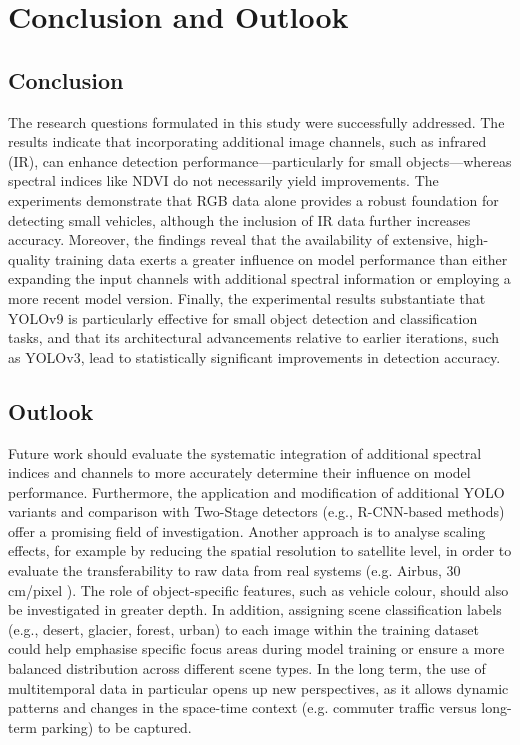 \chapter{Conclusion and Outlook}
\label{ch:conclusion}

\section{Conclusion}

The research questions formulated in this study were successfully addressed. 
The results indicate that incorporating additional image channels, such as infrared (IR), can enhance detection performance—particularly for small objects—whereas spectral indices like NDVI do not necessarily yield improvements. 
The experiments demonstrate that \acrshort{RGB} data alone provides a robust foundation for detecting small vehicles, although the inclusion of \acrshort{IR} data further increases accuracy. Moreover, the findings reveal that the availability of extensive, high-quality training data exerts a greater influence on model performance than either expanding the input channels with additional spectral information or employing a more recent model version. 
Finally, the experimental results substantiate that \acrshort{YOLO}v9 is particularly effective for small object detection and classification tasks, and that its architectural advancements relative to earlier iterations, such as \acrshort{YOLO}v3, lead to statistically significant improvements in detection accuracy.

\section{Outlook}
Future work should evaluate the systematic integration of additional spectral indices and channels to more accurately determine their influence on model performance.
Furthermore, the application and modification of additional \acrshort{YOLO} variants and comparison with Two-Stage detectors (e.g., \acrshort{R-CNN}-based methods) offer a promising field of investigation.
Another approach is to analyse scaling effects, for example by reducing the spatial resolution to satellite level, in order to evaluate the transferability to raw data from real systems (e.g. Airbus, 30 cm/pixel \cite{airbus_neo}).
The role of object-specific features, such as vehicle colour, should also be investigated in greater depth.
In addition, assigning scene classification labels (e.g., desert, glacier, forest, urban) to each image within the training dataset could help emphasise specific focus areas during model training or ensure a more balanced distribution across different scene types.
In the long term, the use of multitemporal data in particular opens up new perspectives, as it allows dynamic patterns and changes in the space-time context (e.g. commuter traffic versus long-term parking) to be captured.
